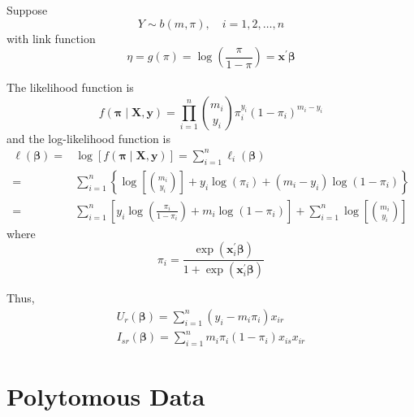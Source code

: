 Suppose
\begin{equation}
	Y\sim b\left(m,\pi\right),\quad i=1,2,\ldots,n
\end{equation}
with link function
\begin{equation}
	\eta=g\left(\pi\right)=\log\left(\frac{\pi}{1-\pi}\right)=\mathbf{x}^{\prime}\boldsymbol{\beta}
\end{equation}
\begin{remark}

\end{remark}

The likelihood function is
\begin{equation}
	f\left(\boldsymbol{\pi}\mid\mathbf{X},\mathbf{y}\right)=\prod_{i=1}^{n}\binom{m_{i}}{y_{i}}\pi_{i}^{y_{i}}\left(1-\pi_{i}\right)^{m_{i}-y_{i}}
\end{equation}
and the log-likelihood function is
\begin{equation}
	\begin{aligned}
		\ell\left(\boldsymbol{\beta}\right)= & \log\left[f\left(\boldsymbol{\pi}\mid\mathbf{X},\mathbf{y}\right)\right]=\sum_{i=1}^{n}\ell_{i}\left(\boldsymbol{\beta}\right)                                 \\
		=                                    & \sum_{i=1}^{n}\left\{\log\left[\binom{m_{i}}{y_{i}}\right]+y_{i}\log\left(\pi_{i}\right)+\left(m_{i}-y_{i}\right)\log\left(1-\pi_{i}\right)\right\}            \\
		=                                    & \sum_{i=1}^{n}\left[y_{i}\log\left(\frac{\pi_{i}}{1-\pi_{i}}\right)+m_{i}\log\left(1-\pi_{i}\right)\right]+\sum_{i=1}^{n}\log\left[\binom{m_{i}}{y_{i}}\right]
	\end{aligned}
\end{equation}
where
\begin{equation}
	\pi_{i}=\frac{\exp\left(\mathbf{x}_{i}^{\prime}\boldsymbol{\beta}\right)}{1+\exp\left(\mathbf{x}_{i}^{\prime}\boldsymbol{\beta}\right)}
\end{equation}

Thus,
\begin{gather*}
	U_{r}\left(\boldsymbol{\beta}\right)=\sum_{i=1}^{n}\left(y_{i}-m_{i}\pi_{i}\right)x_{ir} \\
	I_{sr}\left(\boldsymbol{\beta}\right)=\sum_{i=1}^{n}m_{i}\pi_{i}\left(1-\pi_{i}\right)x_{is}x_{ir}
\end{gather*}

\section{Polytomous Data}

